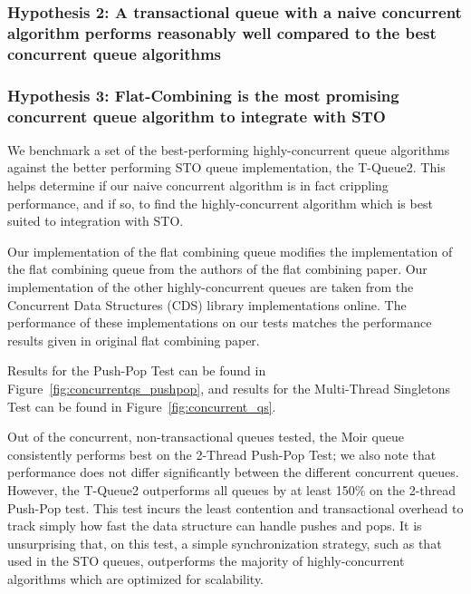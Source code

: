 \vspace{12pt}
\noindent{}

\subsubsection{Hypothesis 2: A transactional queue with a naive concurrent algorithm performs reasonably well compared to the best concurrent queue algorithms}

\subsubsection{Hypothesis 3: Flat-Combining is the most promising concurrent queue algorithm to integrate with STO}

We benchmark a set of the best-performing highly-concurrent queue algorithms against the better performing STO queue implementation, the T-Queue2. This helps determine if our naive concurrent algorithm is in fact crippling performance, and if so, to find the highly-concurrent algorithm which is best suited to integration with STO.
 
 Our implementation of the flat combining queue modifies the implementation of the flat combining queue from the authors of the flat combining paper\cite{flatcombining}. Our implementation of the other highly-concurrent queues are taken from the Concurrent Data Structures (CDS) library implementations online\cite{libcds}. The performance of these implementations on our tests matches the performance results given in original flat combining paper. 

Results for the Push-Pop Test can be found in Figure~\ref{fig:concurrentqs_pushpop}, and results for the Multi-Thread Singletons Test can be found in Figure~\ref{fig:concurrent_qs}.

Out of the concurrent, non-transactional queues tested, the Moir queue\cite{queue2} consistently performs best on the 2-Thread Push-Pop Test; we also note that performance does not differ significantly between the different concurrent queues. However, the T-Queue2 outperforms all queues by at least 150\% on the 2-thread Push-Pop test. This test incurs the least contention and transactional overhead to track simply how fast the data structure can handle pushes and pops. It is unsurprising that, on this test, a simple synchronization strategy, such as that used in the STO queues, outperforms the majority of highly-concurrent algorithms which are optimized for scalability. 
 
